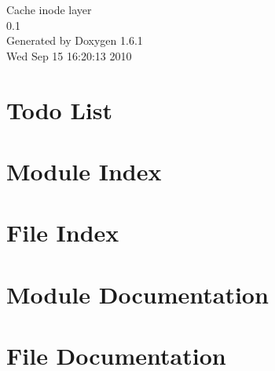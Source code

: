 \documentclass[a4paper]{book}
\begin{document}
\begin{titlepage}
\vspace*{7cm}
\begin{center}
{\Large Cache inode layer \\[1ex]\large 0.1 }\\
\vspace*{1cm}
{\large Generated by Doxygen 1.6.1}\\
\vspace*{0.5cm}
{\small Wed Sep 15 16:20:13 2010}\\
\end{center}
\end{titlepage}
\clearemptydoublepage
{}
\tableofcontents
\clearemptydoublepage
{}
\chapter{Todo List}
\label{todo}

\chapter{Module Index}

\chapter{File Index}

\chapter{Module Documentation}


\chapter{File Documentation}
































\printindex
\end{document}

